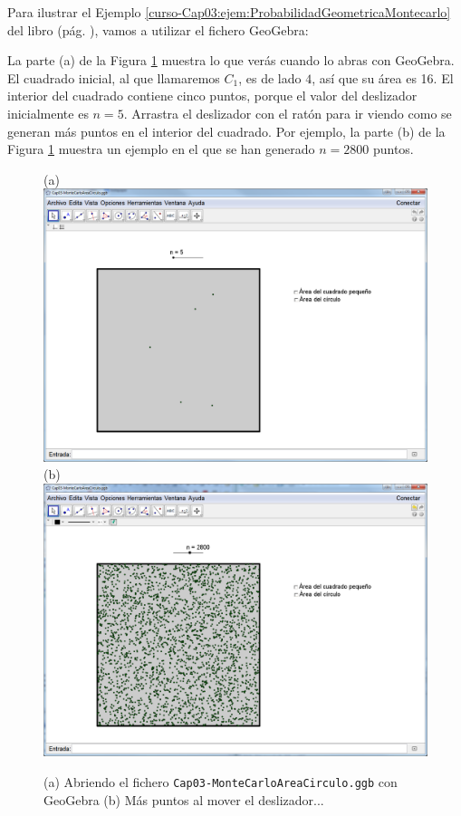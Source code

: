 \documentclass[10pt,a4paper]{article}\usepackage[]{graphicx}\usepackage[]{color}
\newcounter {cont01}
\begin{document}
Para ilustrar el Ejemplo \ref{curso-Cap03:ejem:ProbabilidadGeometricaMontecarlo} del libro (pág. \pageref{curso-Cap03:ejem:ProbabilidadGeometricaMontecarlo}), vamos a utilizar el fichero GeoGebra:
     \begin{center}
\end{center}
La parte (a) de la Figura \ref{tut03:fig:MontecarloAreaCirculo01} muestra lo que verás cuando lo abras con GeoGebra. El cuadrado inicial, al que llamaremos $C_1$, es de lado $4$, así que su área es 16. El interior del cuadrado contiene cinco puntos, porque el valor del deslizador inicialmente es $n=5$. Arrastra el deslizador con el ratón para ir viendo como se generan más puntos en el interior del cuadrado. Por ejemplo, la parte (b) de la Figura \ref{tut03:fig:MontecarloAreaCirculo01} muestra un ejemplo en el que se han generado  $n=2800$ puntos.
\begin{figure}[p]
\begin{center}
(a)\\[3mm]
\includegraphics[width=15cm]{./fig/Tut03-43.png}\\[3mm]
(b)\\[3mm]
\includegraphics[width=15cm]{./fig/Tut03-44.png}
\end{center}
\caption{(a) Abriendo el fichero {\tt Cap03-MonteCarloAreaCirculo.ggb} con GeoGebra (b) Más puntos al mover el deslizador...}
\label{tut03:fig:MontecarloAreaCirculo01}
\end{figure}
\end{document}
